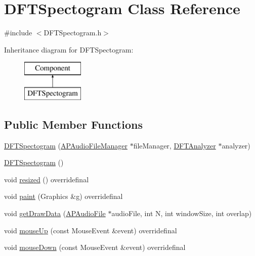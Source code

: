 \hypertarget{class_d_f_t_spectogram}{\section{D\+F\+T\+Spectogram Class Reference}
\label{class_d_f_t_spectogram}
}


{\ttfamily \#include $<$D\+F\+T\+Spectogram.\+h$>$}

Inheritance diagram for D\+F\+T\+Spectogram\+:\begin{figure}[H]
\begin{center}
\leavevmode
\includegraphics[height=2.000000cm]{class_d_f_t_spectogram}
\end{center}
\end{figure}
\subsection*{Public Member Functions}
\begin{DoxyCompactItemize}
\item 
\hyperlink{class_d_f_t_spectogram_aa5a17ff80308637394bbdd456382c6cf}{D\+F\+T\+Spectogram} (\hyperlink{class_a_p_audio_file_manager}{A\+P\+Audio\+File\+Manager} $\ast$file\+Manager, \hyperlink{class_d_f_t_analyzer}{D\+F\+T\+Analyzer} $\ast$analyzer)
\item 
\hyperlink{class_d_f_t_spectogram_a9bdf31e7f8d1a84b751a14f55e8b42db}{D\+F\+T\+Spectogram} ()
\item 
void \hyperlink{class_d_f_t_spectogram_a5bde5298e19b4396b07774a144935c12}{resized} () overridefinal
\item 
void \hyperlink{class_d_f_t_spectogram_a81348bfcec217526a83852865a374881}{paint} (Graphics \&g) overridefinal
\item 
void \hyperlink{class_d_f_t_spectogram_ae07e85a512f188d1127d37b2da39f535}{get\+Draw\+Data} (\hyperlink{class_a_p_audio_file}{A\+P\+Audio\+File} $\ast$audio\+File, int N, int window\+Size, int overlap)
\item 
void \hyperlink{class_d_f_t_spectogram_a033a0af0eec78479c480b72e96fed742}{mouse\+Up} (const Mouse\+Event \&event) overridefinal
\item 
void \hyperlink{class_d_f_t_spectogram_aeea5f226288e6005534f36b30835dd3e}{mouse\+Down} (const Mouse\+Event \&event) overridefinal
\end{DoxyCompactItemize}


